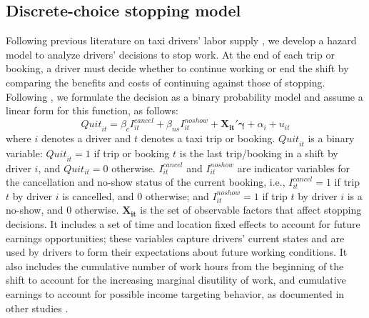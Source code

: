 \documentclass[reviewmode]{AEA}
\begin{document}
\subsection{Discrete-choice stopping model}
Following previous literature on taxi drivers' labor supply \citep{farber2005tomorrow,farber2015you,agarwal2015singaporean,chen2015dynamic}, we develop a hazard model to analyze drivers' decisions to stop work. At the end of each trip or booking, a driver must decide whether to continue working or end the shift by comparing the benefits and costs of continuing against those of stopping. 
Following \citet{farber2005tomorrow,farber2015you}, we  
formulate the decision as a  binary probability model 
and assume a linear form for this function, as follows:
\begin{equation}
\label{eq:quit}
{Quit}_{it} = \beta_{c}I^{cancel}_{it} + \beta_{ns} I^{noshow}_{it} +  \mathbf{X_{it}}'\mathbf{\gamma} + \alpha_i  + u_{it}
\end{equation}
where $i$ denotes a driver and $t$ denotes a taxi trip or booking. ${Quit}_{it}$ is a binary variable: ${Quit}_{it} = 1$ if trip or booking $t$ is the last trip/booking in a shift by driver $i$, and $Quit_{it} = 0$ otherwise. $I^{cancel}_{it}$ and $I^{noshow}_{it}$ are indicator variables for the cancellation and no-show status of the current booking, i.e., $I^{cancel}_{it}=1$ if trip $t$ by driver $i$ is cancelled, and $0$ otherwise; and $I^{noshow}_{it}=1$ if trip $t$ by driver $i$ is a no-show, and $0$ otherwise. $\mathbf{X_{it}}$ is the set of observable factors that affect stopping decisions.  It includes a set of time and location fixed effects to account for future earnings opportunities; these variables capture drivers' current states and are used by drivers to form their expectations about future working conditions. It also includes the cumulative number of work hours from the beginning of the shift to account for the increasing marginal disutility of work, and cumulative earnings to account for possible income targeting behavior, as documented in other studies \citep{camerer1997labor,crawford2011new}.
\end{document}

